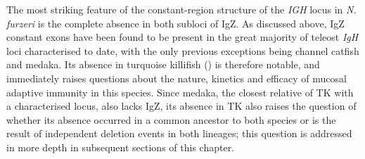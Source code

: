 	The most striking feature of the constant-region structure of the \textit{IGH} locus in \textit{N. furzeri} is the complete absence in both subloci of IgZ. As discussed above, IgZ constant exons have been found to be present in the great majority of teleost \textit{IgH} loci characterised to date, with the only previous exceptions being channel catfish and medaka. Its absence in turquoise killifish () is therefore notable, and immediately raises questions about the nature, kinetics and efficacy of mucosal adaptive immunity in this species. Since medaka, the closest relative of TK with a characterised locus, also lacks IgZ, its absence in TK also raises the question of whether its absence occurred in a common ancestor to both species or is the result of independent deletion events in both lineages; this question is addressed in more depth in subsequent sections of this chapter. %
		

	
